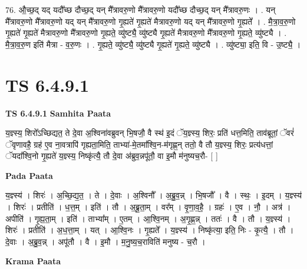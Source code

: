 \documentclass[17pt]{extarticle}
\begin{document}
76. औ॒च्छ॒द् यद् यदौ᳚च्छ दौच्छ॒द् यन् मै᳚त्रावरु॒णो मै᳚त्रावरु॒णो यदौ᳚च्छ दौच्छ॒द् यन् मै᳚त्रावरु॒णः । . यन् मै᳚त्रावरु॒णो मै᳚त्रावरु॒णो यद् यन् मै᳚त्रावरु॒णो गृ॒ह्यते॑ गृ॒ह्यते॑ मैत्रावरु॒णो यद् यन् मै᳚त्रावरु॒णो गृ॒ह्यते᳚ । . मै॒त्रा॒व॒रु॒णो गृ॒ह्यते॑ गृ॒ह्यते॑ मैत्रावरु॒णो मै᳚त्रावरु॒णो गृ॒ह्यते॒ व्यु॑ष्ट्यै॒ व्यु॑ष्ट्यै गृ॒ह्यते॑ मैत्रावरु॒णो मै᳚त्रावरु॒णो गृ॒ह्यते॒ व्यु॑ष्ट्यै । . मै॒त्रा॒व॒रु॒ण इति॑ मैत्रा - व॒रु॒णः । . गृ॒ह्यते॒ व्यु॑ष्ट्यै॒ व्यु॑ष्ट्यै गृ॒ह्यते॑ गृ॒ह्यते॒ व्यु॑ष्ट्यै । . व्यु॑ष्ट्या॒ इति॒ वि - उ॒ष्ट्यै॒ । \newline
\pagebreak
{}

\section{ TS 6.4.9.1 }

\textbf{TS 6.4.9.1 } \newline
\textbf{Samhita Paata} \newline

य॒ज्ञ्स्य॒ शिरो᳚ऽच्छिद्यत॒ ते दे॒वा अ॒श्विना॑वब्रुवन् भि॒षजौ॒ वै स्थ॑ इ॒दं ॅय॒ज्ञ्स्य॒ शिरः॒ प्रति॑ धत्त॒मिति॒ ताव॑ब्रूतां॒ ॅवरं॑ ॅवृणावहै॒ ग्रह॑ ए॒व ना॒वत्रापि॑ गृह्यता॒मिति॒ ताभ्या॑-मे॒तमा᳚श्वि॒न-म॑गृह्ण॒न् ततो॒ वै तौ य॒ज्ञ्स्य॒ शिरः॒ प्रत्य॑धत्तां॒ ॅयदा᳚श्वि॒नो गृ॒ह्यते॑ य॒ज्ञ्स्य॒ निष्कृ॑त्यै॒ तौ दे॒वा अ॑ब्रुव॒न्नपू॑तौ॒ वा इ॒मौ म॑नुष्यच॒रौ- [  ] \newline

\textbf{Pada Paata} \newline

य॒ज्ञ्स्य॑ । शिरः॑ । अ॒च्छि॒द्य॒त॒ । ते । दे॒वाः । अ॒श्विनौ᳚ । अ॒ब्रु॒व॒न्न् । भि॒षजौ᳚ । वै । स्थः॒ । इ॒दम् । य॒ज्ञ्स्य॑ । शिरः॑ । प्रतीति॑ । ध॒त्त॒म् । इति॑ । तौ । अ॒ब्रू॒ता॒म् । वर᳚म् । वृ॒णा॒व॒है॒ । ग्रहः॑ । ए॒व । नौ॒ । अत्र॑ । अपीति॑ । गृ॒ह्य॒ता॒म् । इति॑ । ताभ्या᳚म् । ए॒तम् । आ॒श्वि॒नम् । अ॒गृ॒ह्ण॒न्न् । ततः॑ । वै । तौ । य॒ज्ञ्स्य॑ । शिरः॑ । प्रतीति॑ । अ॒ध॒त्ता॒म् । यत् । आ॒श्वि॒नः । गृ॒ह्यते᳚ । य॒ज्ञ्स्य॑ । निष्कृ॑त्या॒ इति॒ निः - कृ॒त्यै॒ । तौ । दे॒वाः । अ॒ब्रु॒व॒न्न् । अपू॑तौ । वै । इ॒मौ । म॒नु॒ष्य॒च॒राविति॑ मनुष्य - च॒रौ ।  \newline


\textbf{Krama Paata} \newline
\end{document}

